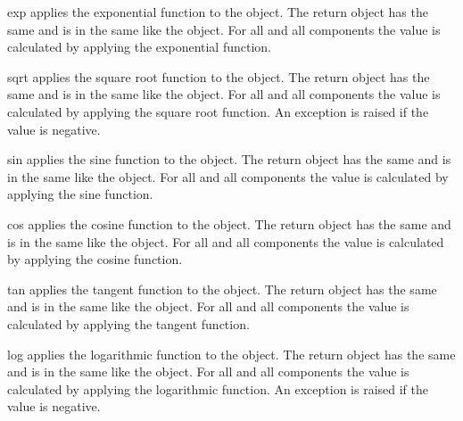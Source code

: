 \begin{methoddesc}[Data]{exp}{} 
applies the exponential function to the object. The
return \Data object has the same \Shape and is in the same
\FunctionSpace like the object. For all \DataSamplePoints and all
components the value is calculated by applying the exponential
function. 
\end{methoddesc}

\begin{methoddesc}[Data]{sqrt}{}
applies the square root function to the object. The
return \Data object has the same \Shape and is in the same
\FunctionSpace like the object. For all \DataSamplePoints and all
components the value is calculated by applying the square root function. 
An exception is
raised if the value is negative.  
\end{methoddesc}

\begin{methoddesc}[Data]{sin}{}
applies the sine function to the object. The
return \Data object has the same \Shape and is in the same
\FunctionSpace like the object. For all \DataSamplePoints and all
components the value is calculated by applying the sine function. 
\end{methoddesc}

\begin{methoddesc}[Data]{cos}{}
applies the cosine function to the object. The
return \Data object has the same \Shape and is in the same
\FunctionSpace like the object. For all \DataSamplePoints and all
components the value is calculated by applying the cosine function. 
\end{methoddesc}

\begin{methoddesc}[Data]{tan}{}
applies the tangent function to the object. The
return \Data object has the same \Shape and is in the same
\FunctionSpace like the object. For all \DataSamplePoints and all
components the value is calculated by applying the tangent function. 
\end{methoddesc}

\begin{methoddesc}[Data]{log}{}
applies the logarithmic function to the object. The
return \Data object has the same \Shape and is in the same
\FunctionSpace like the object. For all \DataSamplePoints and all
components the value is calculated by applying the logarithmic function. An exception is
raised if the value is negative.
\end{methoddesc}


